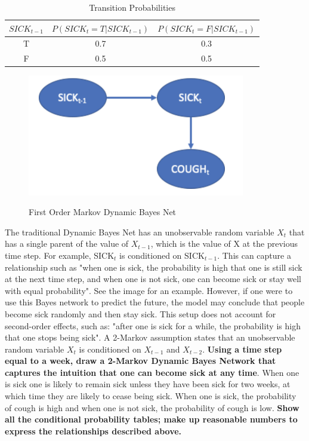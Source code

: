 \documentclass[12pt]{article}
\begin{document}
\begin{table}[h]
    \centering
    \begin{tabular}{|c|c|c|}
    \hline
        \textbf{$SICK_{t-1}$} & $P(SICK_{t}=T | SICK_{t-1})$ & $P(SICK_t=F | SICK_{t-1})$ \\
        \hline
        T & 0.7 & 0.3 \\
        \hline
        F & 0.5 & 0.5 \\
        \hline
    \end{tabular}
    \caption{Transition Probabilities}
    \label{tab:my_label}
\end{table}
\begin{figure}[htp]
    \includegraphics[width=9.5cm, center]{img/P3Q2Bayes.png}
    \label{fig:bayes}
    \caption{First Order Markov Dynamic Bayes Net}
\end{figure}
The traditional Dynamic Bayes Net has an unobservable random variable $X_t$ that 
has a single parent of the value of $X_{t-1}$, which is the value of X at the 
previous time step. For example, SICK$_t$ is conditioned on SICK$_{t-1}$. This can 
capture a relationship such as "when one is sick, the probability is high that one 
is still sick at the next time step, and when one is not sick, one can become sick 
or stay well with equal probability". See the image for an example. However, if one
were to use this Bayes network to predict the future, the model may conclude that 
people become sick randomly and then stay sick. This setup does not account for 
second-order effects, such as: "after one is sick for a while, the probability is 
high that one stops being sick". A 2-Markov assumption states that an unobservable 
random variable $X_t$ is conditioned on $X_{t-1}$ and $X_{t-2}$. \textbf{Using a
time step equal to a week, draw a 2-Markov Dynamic Bayes Network
that captures the intuition that one can become sick at any time}. When 
one is sick one is likely to remain sick unless they have been sick for two weeks, 
at which time they are likely to cease being sick. When one is sick, the 
probability of cough is high and when one is not sick, the probability of cough is 
low. \textbf{Show all the conditional probability tables; 
make up reasonable numbers to express the relationships 
described above.} \\
\end{document}
